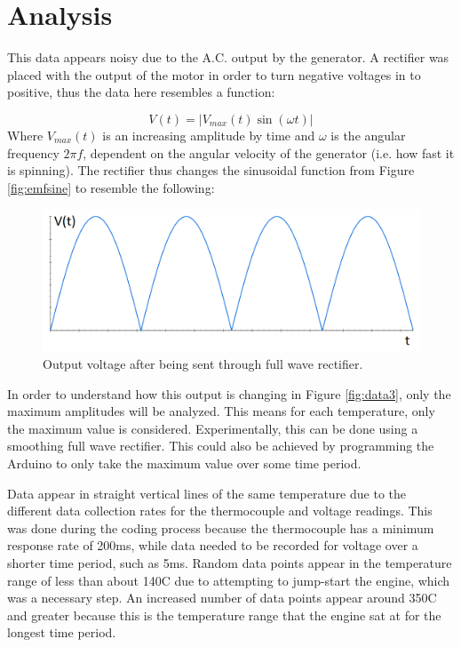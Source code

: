 \section{Analysis}
    
    This data appears noisy due to the A.C. output by the generator. A rectifier was placed with the output of the motor in order to turn negative voltages in to positive, thus the data here resembles a function:
    
    \begin{equation}
        V(t) = \lvert V_{max}(t) \sin(\omega t) \rvert
        \label{eqn:sin}
    \end{equation}
    Where $V_{max}(t)$ is an increasing amplitude by time and $\omega$ is the angular frequency $2\pi f$, dependent on the angular velocity of the generator (i.e. how fast it is spinning). The rectifier thus changes the sinusoidal function from Figure \ref{fig:emfsine} to resemble the following:
    
    \begin{figure}[H]
        \centering
        \includegraphics[width=\textwidth]{diagrams/rectifysin}
        \caption[Rectified A.C. output]{Output voltage after being sent through full wave rectifier.}
        \label{fig:rectified}
    \end{figure}
    
    In order to understand how this output is changing in Figure \ref{fig:data3}, only the maximum amplitudes will be analyzed. This means for each temperature, only the maximum value is considered. Experimentally, this can be done using a smoothing full wave rectifier. This could also be achieved by  programming the Arduino to only take the maximum value over some time period. 
    
    Data appear in straight vertical lines of the same temperature due to the different data collection rates for the thermocouple and voltage readings. This was done during the coding process because the thermocouple has a minimum response rate of 200ms, while data needed to be recorded for voltage over a shorter time period, such as 5ms. Random data points appear in the temperature range of less than about 140\degree C due to attempting to jump-start the engine, which was a necessary step. An increased number of data points appear around 350\degree C and greater because this is the temperature range that the engine sat at for the longest time period.